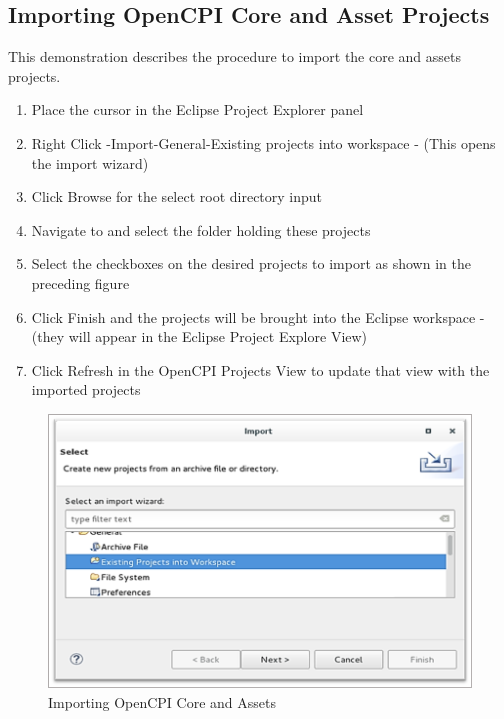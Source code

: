 \documentclass[10pt, a4paper, oneside]{article}
\begin{document}
\subsection{Importing OpenCPI Core and Asset Projects}
This demonstration describes the procedure to import the core and assets projects.
\begin {enumerate}
\item	Place the cursor in the Eclipse Project Explorer panel
\item	Right Click -Import-General-Existing projects into workspace - (This opens the import wizard)
\item	Click Browse for the select root directory input
\item	Navigate to and select the folder holding these projects
\item	Select the checkboxes on the desired projects to import as shown in the preceding figure
\item	Click Finish and the projects will be brought into the Eclipse workspace - (they will appear in the Eclipse Project Explore View)
\item	Click Refresh in the OpenCPI Projects View to update that view with the imported projects
\end{enumerate}
\begin{figure}[h!]
	\centering
	\caption{Importing OpenCPI Core and Assets}\label{fig:Importing OpenCPI Core and Assets}
	\includegraphics[width=.80\textwidth]{ImportingOpenCPICoreandAssets.png}
 \end{figure}
\end{document}

